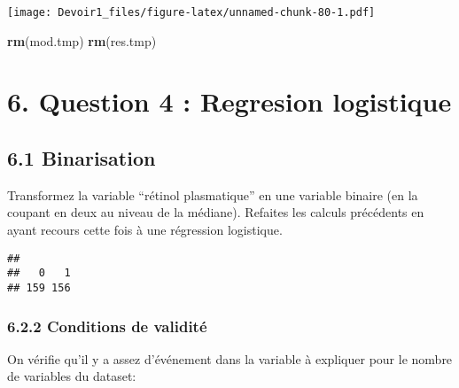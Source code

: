 \documentclass[]{article}
\newenvironment{Shaded}{\begin{snugshade}}{\end{snugshade}}
\newcommand{\KeywordTok}[1]{\textcolor[rgb]{0.13,0.29,0.53}{\textbf{#1}}}
\newcommand{\DecValTok}[1]{\textcolor[rgb]{0.00,0.00,0.81}{#1}}
\newcommand{\StringTok}[1]{\textcolor[rgb]{0.31,0.60,0.02}{#1}}
\newcommand{\OperatorTok}[1]{\textcolor[rgb]{0.81,0.36,0.00}{\textbf{#1}}}
\newcommand{\NormalTok}[1]{#1}
\begin{document}
\texttt{[image: Devoir1\_files/figure-latex/unnamed-chunk-80-1.pdf]}

\begin{Shaded}
\begin{Highlighting}[]
\KeywordTok{rm}\NormalTok{(mod.tmp)}
\KeywordTok{rm}\NormalTok{(res.tmp)}
\end{Highlighting}
\end{Shaded}

\section{6. Question 4 : Regresion
logistique}\label{question-4-regresion-logistique}

\subsection{6.1 Binarisation}\label{binarisation}

Transformez la variable ``rétinol plasmatique'' en une variable binaire
(en la coupant en deux au niveau de la médiane). Refaites les calculs
précédents en ayant recours cette fois à une régression logistique.

\begin{Shaded}
\end{Shaded}

\begin{verbatim}
## 
##   0   1 
## 159 156
\end{verbatim}

\subsubsection{6.2.2 Conditions de
validité}\label{conditions-de-validituxe9}

On vérifie qu'il y a assez d'événement dans la variable à expliquer pour
le nombre de variables du dataset:

\begin{Shaded}
\end{Shaded}
\end{document}
